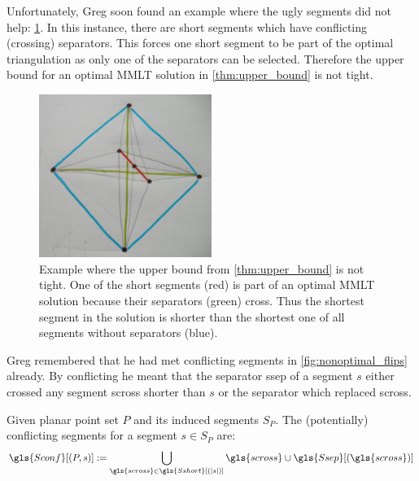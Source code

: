 Unfortunately, Greg soon found an example where the ugly segments did
not help: \cref{fig:upper_bound_tightness}. In this instance, there
are short segments which have conflicting (crossing) separators. This
forces one short segment to be part of the optimal triangulation as
only one of the separators can be selected. Therefore the upper bound
for an optimal \gls{MMLT} solution in \cref{thm:upper_bound} is not
tight.

\begin{figure}[ht]
  \centering
  \includegraphics[width=0.5\textwidth]{img/upper_bound_tightness.jpg}
  \caption{
    \label{fig:upper_bound_tightness}
    Example where the upper bound from \cref{thm:upper_bound} is not 
    tight. One of the short segments (red) is part of an optimal 
    \gls{MMLT} solution because their separators (green) cross. Thus
    the shortest segment in the solution is shorter than the shortest
    one of all segments without separators (blue).
  }
\end{figure}  

Greg remembered that he had met conflicting segments in 
\cref{fig:nonoptimal_flips} already. By conflicting he meant that the
separator \gls{ssep} of a segment \(s\) either crossed any segment
\gls{scross} shorter than \(s\) or the separator which replaced
\gls{scross}. 


\begin{definition}\label{def:conflicting_segments}
  Given planar point set \(P\) and its induced segments \(S_P\). The
  (potentially) conflicting segments for a segment \(s \in S_P\) are:
  \[
    \gls{Sconf}[(P,s)] :=
      \bigcup_{\gls{scross} \in \gls{Sshort}[(|s|)]}
      \gls{scross} \cup \gls{Ssep}[(\gls{scross})]
  \]
\end{definition}

